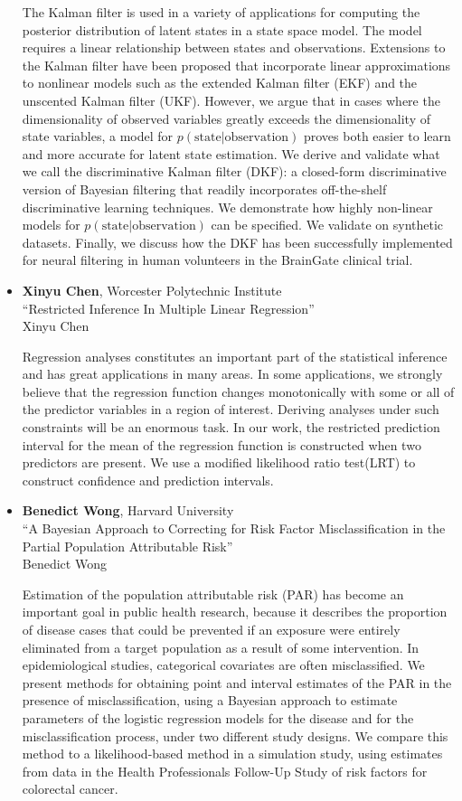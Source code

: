 \begin{itemize}
The Kalman filter is used in a variety of applications for computing the posterior distribution of latent states in a state space model.  The model requires a linear relationship between states and observations. Extensions to the Kalman filter have been proposed that incorporate linear approximations to nonlinear models such as the extended Kalman filter (EKF) and the unscented Kalman filter (UKF). However, we argue that in cases where the dimensionality of observed variables greatly exceeds the dimensionality of state variables, a model for $p(\text{state}|\text{observation})$ proves both easier to learn and more accurate for latent state estimation.  We derive and validate what we call the discriminative Kalman filter (DKF): a closed-form discriminative version of Bayesian filtering that readily incorporates off-the-shelf discriminative learning techniques. We demonstrate how highly non-linear models for $p(\text{state}|\text{observation})$ can be specified. We validate on synthetic datasets.  Finally, we discuss how the DKF has been successfully implemented for neural filtering in human volunteers in the BrainGate clinical trial.

\item \textbf{Xinyu Chen}, Worcester Polytechnic Institute \\
``Restricted Inference In Multiple Linear Regression'' \\
Xinyu Chen


Regression analyses constitutes an important part of the statistical inference and has great applications in many areas. In some applications, we strongly believe that the regression function changes monotonically with some or all of the predictor variables in a region of interest. Deriving analyses under such constraints will be an enormous task. In our work, the restricted prediction interval for the mean of the regression function is constructed when two predictors are present. We use a modified likelihood ratio test(LRT) to construct confidence and prediction intervals. 

\item \textbf{Benedict Wong}, Harvard University \\
``A Bayesian Approach to Correcting for Risk Factor Misclassification in the Partial Population Attributable Risk'' \\
Benedict Wong


Estimation of the population attributable risk (PAR) has become an important goal in public health research, because it describes the proportion of disease cases that could be prevented if an exposure were entirely eliminated from a target population as a result of some intervention. In epidemiological studies, categorical covariates are often misclassified. We present methods for obtaining point and interval estimates of the PAR in the presence of misclassification, using a Bayesian approach to estimate parameters of the logistic regression models for the disease and for the misclassification process, under two different study designs. We compare this method to a likelihood-based method in a simulation study, using estimates from data in the Health Professionals Follow-Up Study of risk factors for colorectal cancer.


\end{itemize}
